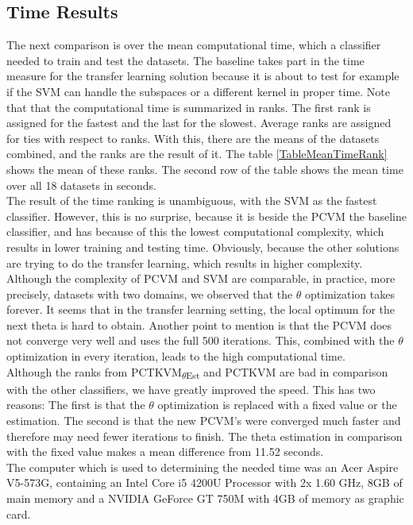 \subsection{Time Results}\label{EmSubSecTimeResults}
The next comparison is over the mean computational time, which a classifier needed to train and test the datasets.
The baseline takes part in the time measure for the transfer learning solution because it is about to test for example if the \acs{SVM} can handle the subspaces or a different kernel in proper time.
Note that that the computational time is summarized in ranks.
The first rank is assigned for the fastest and the last for the slowest.
Average ranks are assigned for ties with respect to ranks.
With this, there are the means of the datasets combined, and the ranks are the result of it.
The table \ref{TableMeanTimeRank} shows the mean of these ranks.
The second row of the table shows the mean time over all 18 datasets in seconds.\\
The result of the time ranking is unambiguous, with the \acs{SVM} as the fastest classifier. 
However, this is no surprise, because it is beside the \acs{PCVM} the baseline classifier, and has because of this the lowest computational complexity, which results in lower training and testing time.
Obviously, because the other solutions are trying to do the transfer learning, which results in higher complexity.\\
Although the complexity of \acs{PCVM} and \acs{SVM} are comparable, in practice, more precisely, datasets with two domains, we observed that the $\theta$ optimization takes forever.
It seems that in the transfer learning setting, the local optimum for the next theta is hard to obtain.
Another point to mention is that the \acs{PCVM} does not converge very well and uses the full 500 iterations. 
This, combined with the $\theta$ optimization in every iteration, leads to the high computational time.\\
Although the ranks from \acs{PCTKVM}\textsubscript{$\theta$Est} and \acs{PCTKVM} are bad in comparison with the other classifiers, we have greatly improved the speed.
This has two reasons: 
The first is that the $\theta$ optimization is replaced with a fixed value or the estimation.
The second is that the new \acs{PCVM}'s were converged much faster and therefore may need fewer iterations to finish.
The theta estimation in comparison with the fixed value makes a mean difference from 11.52 seconds.\\
The computer which is used to determining the needed time was an Acer Aspire V5-573G, containing an Intel Core i5 4200U Processor with 2x 1.60 GHz, 8GB of main memory and a NVIDIA GeForce GT 750M with 4GB of memory as graphic card.

